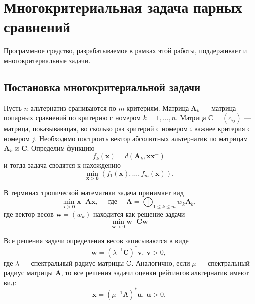 \documentclass[specialist,
  substylefile = spbu.rtx,
  href,
  colorlinks=true,
  12pt]{disser}
\begin{document}
\section{Многокритериальная задача парных сравнений}
Программное средство, разрабатываемое в рамках этой работы, поддерживает и многокритериальные задачи.

\subsection{Постановка многокритериальной задачи}

Пусть $n$ альтернатив сраниваются по $m$ критериям.
Матрица $\boldsymbol{A}_k$ --- матрица попарных сравнений по критерию с номером $k = 1, \dots, n$.
Матрица $\boldsymbol{С} = (c_{ij})$ --- матрица, показывающая, во сколько раз критерий с номером $i$ важнее критерия с номером $j$. Необходимо построить вектор абсолютных альтернатив по матрицам $\boldsymbol{A}_k$ и $\boldsymbol{C}$.
Определим функцию
$$
f_{k}(\boldsymbol{x})=d\left(\boldsymbol{A}_{k}, \boldsymbol{x} \boldsymbol{x}^{-}\right)	
$$ и тогда задача сводится к нахождению
$$
\min _{\boldsymbol{x}>\mathbf{0}}\left(f_{1}(\boldsymbol{x}), \ldots, f_{m}(\boldsymbol{x})\right).
$$

В терминах тропической математики задача принимает вид
$$
\min _{\boldsymbol{x}>\mathbf{0}} \boldsymbol{x}^{-} \boldsymbol{A} \boldsymbol{x}, \quad \text { где } \quad \boldsymbol{A}=\bigoplus_{1 \leq k \leq m} w_{k} \boldsymbol{A}_{k},
$$
где вектор весов $\boldsymbol{w}=\left(w_{k}\right)$ находится как решение задачи
\[
\min _{\boldsymbol{w}>0} \boldsymbol{w}^{-} \boldsymbol{C} \boldsymbol{w}
\]

Все решения задачи определения весов записываются в виде
\[
	\boldsymbol{w} = (\lambda^{-1}\boldsymbol{C})^*\boldsymbol{v}, ~\boldsymbol{v} > 0,
\]
где $\lambda$ --- спектральный радиус матрицы $\boldsymbol{C}$. Аналогично, если $\mu$ --- спектральный радиус матрицы $\boldsymbol{A}$, то все решения задачи оценки рейтингов альтернатив имеют вид: 
\[
	\boldsymbol{x} = (\mu^{-1}\boldsymbol{A})^*\boldsymbol{u},~\boldsymbol{u} > 0.
\]
\end{document}
